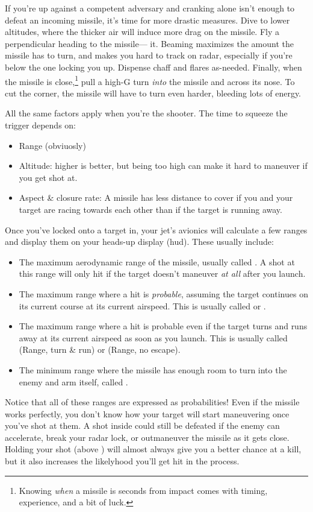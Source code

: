 If you're up against a competent adversary and cranking alone isn't enough to
defeat an incoming missile, it's time for more drastic measures.
Dive to lower altitudes, where the thicker air will induce more drag on
the missile. Fly a perpendicular heading to the missile--- it.
Beaming maximizes the amount the missile has to turn,
and makes you hard to track on radar,
especially if you're below the one locking you up.
Dispense chaff and flares as-needed.
Finally, when the missile is close,\punckern\footnote{Knowing \emph{when} a
missile is seconds from impact comes with timing, experience, and a bit of luck.}
pull a high-G turn \emph{into} the missile and across its nose.
To cut the corner, the missile will have to turn even harder,
bleeding lots of energy.

All the same factors apply when you're the shooter.
The time to squeeze the trigger depends on:
\begin{itemize}
\item Range (obviuosly)
\item Altitude: higher is better, but being too high can make it hard to
    maneuver if you get shot at.
\item Aspect \& closure rate:
    A missile has less distance to cover if you and your target are racing
    towards each other than if the target is running away.
\end{itemize}
Once you've locked onto a target in,
your jet's avionics will calculate a few ranges and display them on your
heads-up display \ac{(hud)}.
These usually include:
\begin{itemize}
\item The maximum aerodynamic range of the missile, usually called
    .
    A shot at this range will only hit if the target doesn't maneuver
    \emph{at all} after you launch.
\item The maximum range where a hit is \emph{probable},
    assuming the target continues on its current course at its current airspeed.
    This is usually called  or .
\item The maximum range where a hit is probable
    even if the target turns and runs away at its current airspeed
    as soon as you launch.
    This is usually called  (Range, turn \& run)
    or  (Range, no escape).
\item The minimum range where the missile has enough room to turn into the
    enemy and arm itself, called .
\end{itemize}
Notice that all of these ranges are expressed as probabilities!
Even if the missile works perfectly,
you don't know how your target will start maneuvering once you've shot at them.
A shot inside  could still be defeated if the enemy can accelerate,
break your radar lock, or outmaneuver the missile as it gets close.
Holding your shot (above ) will almost always give you
a better chance at a kill,
but it also increases the likelyhood you'll get hit in the process.

